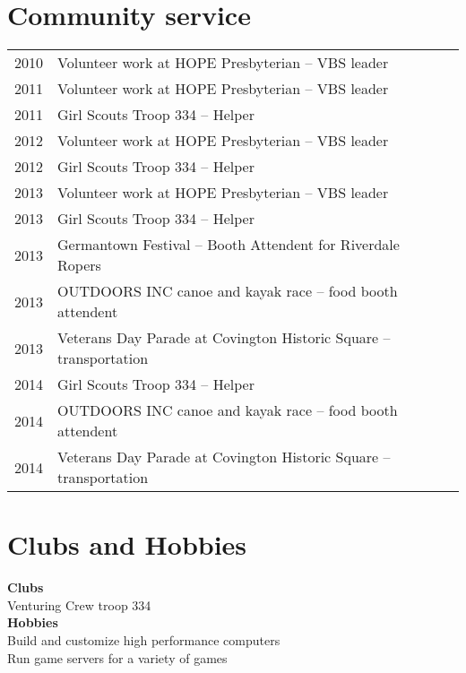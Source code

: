 \documentclass[letterpaper]{deedy-resume} %
\begin{document}
\begin{minipage}[t]{0.64\textwidth}
\begin{tabular}{rll}
\end{tabular}

\sectionspace %


\section{Community service} 

\begin{tabular}{rll}
2010	 & Volunteer work at HOPE Presbyterian -- VBS leader \\
2011	 & Volunteer work at HOPE Presbyterian -- VBS leader \\
2011	 & Girl Scouts Troop 334 -- Helper \\
2012	 & Volunteer work at HOPE Presbyterian -- VBS leader \\
2012	 & Girl Scouts Troop 334 -- Helper \\
2013	 & Volunteer work at HOPE Presbyterian -- VBS leader \\
2013	 & Girl Scouts Troop 334 -- Helper \\
2013	 & Germantown Festival -- Booth Attendent for Riverdale Ropers \\
2013	 & OUTDOORS INC canoe and kayak race -- food booth attendent \\
2013	 & Veterans Day Parade at Covington Historic Square -- transportation \\
2014	 & Girl Scouts Troop 334 -- Helper \\
2014	 & OUTDOORS INC canoe and kayak race -- food booth attendent \\
2014	 & Veterans Day Parade at Covington Historic Square -- transportation \\

\end{tabular}

\sectionspace %

 \section{Clubs and Hobbies} 
 \textbf{Clubs} \\
 Venturing Crew troop 334 \\
 \textbf{Hobbies} \\
 Build and customize high performance computers \\
 Run game servers for a variety of games \\
 



\end{minipage}
\end{document}
